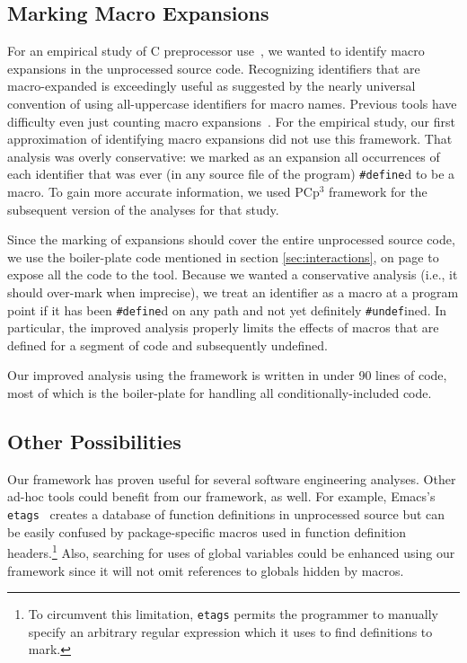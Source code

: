 \documentclass{article}
\newcommand{\pcp}{\mbox{\textsf{PCp}$^3$}}
\newcommand{\C}{\mbox{C}}
\newcommand{\ppd}[1]{\texttt{\##1}}
\newcommand{\sectionref}[1]{section \ref{#1}, on page \pageref{#1}}
\newcommand{\ie}{i.e.,}
\begin{document}
\subsection{Marking Macro Expansions}
\label{ssec:mark_macros}
\nopagebreak

For an empirical study of \C{} preprocessor use~\cite{EmpCpp-TR}, we
wanted to identify macro expansions in the unprocessed source code.
Recognizing identifiers that are macro-expanded is exceedingly useful as
suggested by the nearly universal convention of using all-uppercase
identifiers for macro names.  Previous tools have difficulty even just
counting macro expansions~\cite{Griswold96}.  For the empirical study,
our first approximation of identifying macro expansions did not use this
framework.  That analysis was overly conservative: we marked as an
expansion all occurrences of each identifier that was ever
(in any source file of the program) \ppd{define}d to be a macro.
To gain more accurate information, we used \pcp{}
framework for the subsequent version of the analyses for that study.

Since the marking of expansions should cover the entire unprocessed
source code, we use the boiler-plate code mentioned in \sectionref{sec:interactions}
to expose all the code to the tool.  Because we wanted a
conservative analysis (\ie{} it should over-mark when imprecise), we treat an
identifier as a macro at a program point if it has been \ppd{define}d on
any path and not yet definitely \ppd{undef}ined.  In particular, the
improved analysis properly limits the effects of macros that are
defined for a segment of code and subsequently undefined.

Our improved analysis using the framework is written in under 90 lines
of code, most of which is the boiler-plate for handling all
conditionally-included code.

\subsection{Other Possibilities}
\label{ssec:other_poss}

Our framework has proven useful for several software engineering
analyses.  Other ad-hoc tools could benefit from our framework, as well.
For example, Emacs's \texttt{etags}~\cite{GNUELisp} creates a database
of function definitions in unprocessed source but can be easily confused
by package-specific macros used in function definition headers.\footnote{To
circumvent this limitation, \texttt{etags} permits the programmer to manually specify an
arbitrary regular expression which it uses to find definitions to mark.}
Also, searching for uses of global variables could be enhanced using our
framework since it will not omit references to globals hidden by macros.
\end{document}
